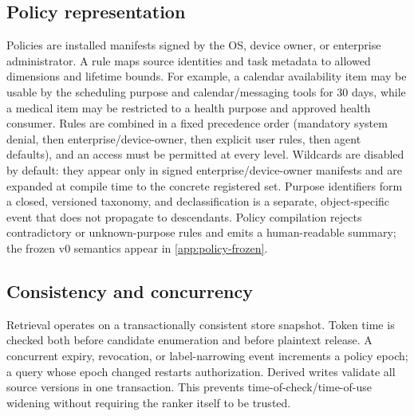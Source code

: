 \subsection{Policy representation}

Policies are installed manifests signed by the OS, device owner, or enterprise administrator. A rule maps source identities and task metadata to allowed dimensions and lifetime bounds. For example, a calendar availability item may be usable by the scheduling purpose and calendar/messaging tools for 30 days, while a medical item may be restricted to a health purpose and approved health consumer. Rules are combined in a fixed precedence order (mandatory system denial, then enterprise/device-owner, then explicit user rules, then agent defaults), and an access must be permitted at every level. Wildcards are disabled by default: they appear only in signed enterprise/device-owner manifests and are expanded at compile time to the concrete registered set. Purpose identifiers form a closed, versioned taxonomy, and declassification is a separate, object-specific event that does not propagate to descendants. Policy compilation rejects contradictory or unknown-purpose rules and emits a human-readable summary; the frozen v0 semantics appear in \cref{app:policy-frozen}.

\subsection{Consistency and concurrency}

Retrieval operates on a transactionally consistent store snapshot. Token time is checked both before candidate enumeration and before plaintext release. A concurrent expiry, revocation, or label-narrowing event increments a policy epoch; a query whose epoch changed restarts authorization. Derived writes validate all source versions in one transaction. This prevents time-of-check/time-of-use widening without requiring the ranker itself to be trusted.
